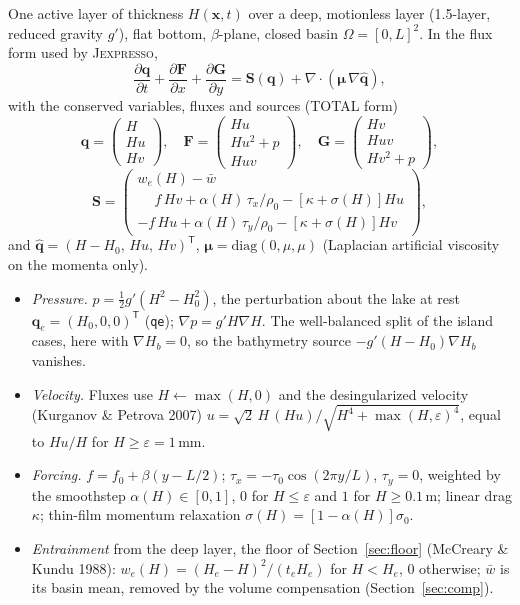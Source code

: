 \documentclass[11pt]{article}
\newcommand{\code}[1]{{\def\_{\char`\_\discretionary{}{}{}}\texttt{#1}}}
\newcommand{\bq}{\mathbf{q}}
\newcommand{\bF}{\mathbf{F}}
\newcommand{\bS}{\mathbf{S}}
\begin{document}
One active layer of thickness $H(\mathbf{x},t)$ over a deep, motionless layer
(1.5-layer, reduced gravity $g'$), flat bottom, $\beta$-plane, closed basin
$\Omega=[0,L]^2$. In the flux form used by \textsc{Jexpresso},
\begin{equation}
\frac{\partial \bq}{\partial t} + \frac{\partial \bF}{\partial x}
+ \frac{\partial \mathbf{G}}{\partial y}
= \bS(\bq) + \nabla\cdot\left(\bm{\mu}\,\nabla\hat{\bq}\right),
\label{eq:pde}
\end{equation}
with the conserved variables, fluxes and sources (TOTAL form)
\begin{equation}
\bq=\begin{pmatrix} H\\ Hu\\ Hv\end{pmatrix},\quad
\bF=\begin{pmatrix} Hu\\ Hu^2+p\\ Huv\end{pmatrix},\quad
\mathbf{G}=\begin{pmatrix} Hv\\ Huv\\ Hv^2+p\end{pmatrix},
\label{eq:flux}
\end{equation}
\begin{equation}
\bS=\begin{pmatrix}
w_e(H)-\bar w\\
\phantom{-}f\,Hv+\alpha(H)\,\tau_x/\rho_0-\left[\kappa+\sigma(H)\right]Hu\\
-f\,Hu+\alpha(H)\,\tau_y/\rho_0-\left[\kappa+\sigma(H)\right]Hv
\end{pmatrix},
\label{eq:source}
\end{equation}
and $\hat{\bq}=(H-H_0,\,Hu,\,Hv)^{\mathsf T}$, $\bm{\mu}=\mathrm{diag}(0,\mu,\mu)$
(Laplacian artificial viscosity on the momenta only).
\begin{itemize}\setlength\itemsep{2pt}
\item \emph{Pressure.} $p=\tfrac12 g'(H^2-H_0^2)$, the perturbation about the
lake at rest $\bq_e=(H_0,0,0)^{\mathsf T}$ (\code{qe}); $\nabla p=g'H\nabla H$.
The well-balanced split of the island cases, here with $\nabla H_b=0$, so the
bathymetry source $-g'(H-H_0)\nabla H_b$ vanishes.
\item \emph{Velocity.} Fluxes use $H\leftarrow\max(H,0)$ and the
desingularized velocity (Kurganov \& Petrova 2007)
$u=\sqrt2\,H\,(Hu)/\sqrt{H^4+\max(H,\varepsilon)^4}$, equal to $Hu/H$ for
$H\ge\varepsilon=1$\,mm.
\item \emph{Forcing.} $f=f_0+\beta(y-L/2)$;
$\tau_x=-\tau_0\cos(2\pi y/L)$, $\tau_y=0$, weighted by the smoothstep
$\alpha(H)\in[0,1]$, $0$ for $H\le\varepsilon$ and $1$ for $H\ge 0.1$\,m;
linear drag $\kappa$; thin-film momentum relaxation
$\sigma(H)=\left[1-\alpha(H)\right]\sigma_0$.
\item \emph{Entrainment} from the deep layer, the floor of
Section~\ref{sec:floor} (McCreary \& Kundu 1988):
$w_e(H)=(H_e-H)^2/(t_eH_e)$ for $H<H_e$, $0$ otherwise; $\bar w$ is its basin
mean, removed by the volume compensation (Section~\ref{sec:comp}).
\end{itemize}
\end{document}
